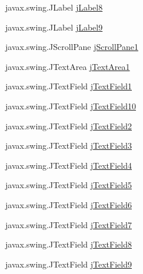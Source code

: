 \begin{DoxyCompactItemize}
\item 
javax.\+swing.\+J\+Label \mbox{\hyperlink{class_interfaz_package_1_1_alta_libro_texto_a6af032fd25dc61f681ff44cc8e561afe}{j\+Label8}}
\item 
javax.\+swing.\+J\+Label \mbox{\hyperlink{class_interfaz_package_1_1_alta_libro_texto_af230caad4def2d93c0ebd623faf2dd01}{j\+Label9}}
\item 
javax.\+swing.\+J\+Scroll\+Pane \mbox{\hyperlink{class_interfaz_package_1_1_alta_libro_texto_af0ec7280008c4e358d18317fcb88717c}{j\+Scroll\+Pane1}}
\item 
javax.\+swing.\+J\+Text\+Area \mbox{\hyperlink{class_interfaz_package_1_1_alta_libro_texto_a932e78a85a86520a9a585c0e41c4fe48}{j\+Text\+Area1}}
\item 
javax.\+swing.\+J\+Text\+Field \mbox{\hyperlink{class_interfaz_package_1_1_alta_libro_texto_ad2e5ab6c5fe3388ffe5a1856c21c3bf0}{j\+Text\+Field1}}
\item 
javax.\+swing.\+J\+Text\+Field \mbox{\hyperlink{class_interfaz_package_1_1_alta_libro_texto_ac8b1eeb9a66899467821be3b3a5b08f4}{j\+Text\+Field10}}
\item 
javax.\+swing.\+J\+Text\+Field \mbox{\hyperlink{class_interfaz_package_1_1_alta_libro_texto_ae43d7202d0822d35d7b160c6596351e6}{j\+Text\+Field2}}
\item 
javax.\+swing.\+J\+Text\+Field \mbox{\hyperlink{class_interfaz_package_1_1_alta_libro_texto_ac608b783532f41462f25b74539afaece}{j\+Text\+Field3}}
\item 
javax.\+swing.\+J\+Text\+Field \mbox{\hyperlink{class_interfaz_package_1_1_alta_libro_texto_ac1148593c3d9a5aab2b7133128c72cc3}{j\+Text\+Field4}}
\item 
javax.\+swing.\+J\+Text\+Field \mbox{\hyperlink{class_interfaz_package_1_1_alta_libro_texto_ae2fee696ae7cc02fa1e6d395e6f55052}{j\+Text\+Field5}}
\item 
javax.\+swing.\+J\+Text\+Field \mbox{\hyperlink{class_interfaz_package_1_1_alta_libro_texto_a4f5e17cbbb06d3f1876983c80d2587a9}{j\+Text\+Field6}}
\item 
javax.\+swing.\+J\+Text\+Field \mbox{\hyperlink{class_interfaz_package_1_1_alta_libro_texto_af62a5b21c777c6bcb18074f1aeaed986}{j\+Text\+Field7}}
\item 
javax.\+swing.\+J\+Text\+Field \mbox{\hyperlink{class_interfaz_package_1_1_alta_libro_texto_a2d1f30b1c7ece5ce2c890c5595ecdbc7}{j\+Text\+Field8}}
\item 
javax.\+swing.\+J\+Text\+Field \mbox{\hyperlink{class_interfaz_package_1_1_alta_libro_texto_a089a5e28cbdf761694e6edd1136f8630}{j\+Text\+Field9}}
\end{DoxyCompactItemize}



